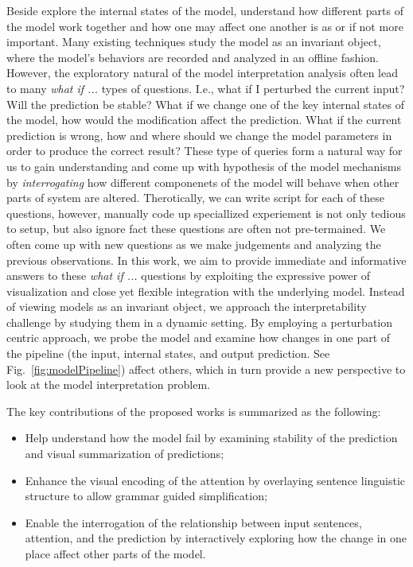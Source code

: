 Beside explore the internal states of the model, understand how different parts of the model work together and how one may affect one another is as or if not more important.
Many existing techniques study the model as an invariant object, where the model's behaviors are recorded and analyzed in an offline fashion.
%
However, the exploratory natural of the model interpretation analysis often lead to many \emph{what if ...} types of questions. I.e., what if I perturbed the current input? Will the prediction be stable? What if we change one of the key internal states of the model, how would the modification affect the prediction. What if the current prediction is wrong, how and where should we change the model parameters in order to produce the correct result? These type of queries form a natural way for us to gain understanding and come up with hypothesis of the model mechanisms by \emph{interrogating} how different componenets of the model will behave when other parts of system are altered. Therotically, we can write script for each of these questions, however, manually code up speciallized experiement is not only tedious to setup, but also ignore fact these questions are often not pre-termained. We often come up with new questions as we make judgements and analyzing the previous observations.
%
In this work, we aim to provide immediate and informative answers to these \emph{what if ...} questions by exploiting the expressive power of visualization and close yet flexible integration with the underlying model. Instead of viewing models as an invariant object, we approach the interpretability challenge by studying them in a dynamic setting. By employing a perturbation centric approach, we probe the model and examine how changes in one part of the pipeline (the input, internal states, and output prediction. See Fig.~\ref{fig:modelPipeline}) affect others, which in turn provide a new perspective to look at the model interpretation problem.

The key contributions of the proposed works is summarized as the following:
\begin{itemize}
    \item Help understand how the model fail by examining stability of the prediction and visual summarization of predictions;

    \item Enhance the visual encoding of the attention by overlaying sentence linguistic structure to allow grammar guided simplification;

    \item Enable the interrogation of the relationship between input sentences, attention, and the prediction by interactively exploring how the change in one place affect other parts of the model.

\end{itemize}
%


